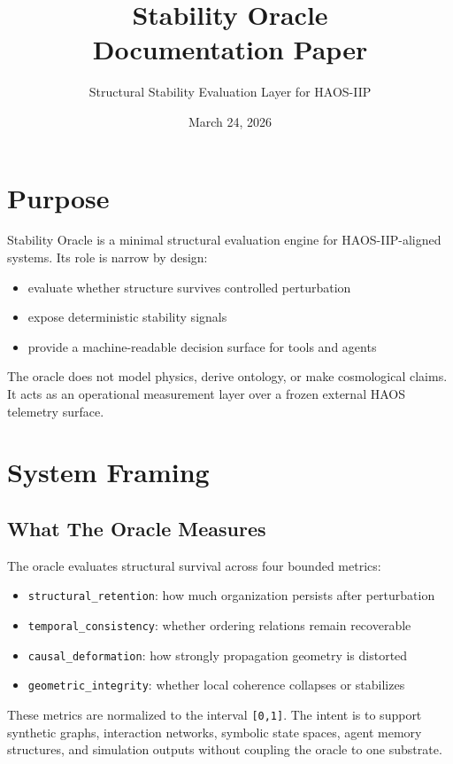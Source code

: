 \documentclass[11pt]{article}
\title{Stability Oracle\\Documentation Paper}
\author{Structural Stability Evaluation Layer for HAOS-IIP}
\date{March 24, 2026}
\begin{document}
\maketitle
\tableofcontents
\newpage

\section{Purpose}

Stability Oracle is a minimal structural evaluation engine for HAOS-IIP-aligned systems.
Its role is narrow by design:

\begin{itemize}
\item evaluate whether structure survives controlled perturbation
\item expose deterministic stability signals
\item provide a machine-readable decision surface for tools and agents
\end{itemize}

The oracle does not model physics, derive ontology, or make cosmological claims.
It acts as an operational measurement layer over a frozen external HAOS telemetry surface.

\section{System Framing}

\subsection{What The Oracle Measures}

The oracle evaluates structural survival across four bounded metrics:

\begin{itemize}
\item \texttt{structural\_retention}: how much organization persists after perturbation
\item \texttt{temporal\_consistency}: whether ordering relations remain recoverable
\item \texttt{causal\_deformation}: how strongly propagation geometry is distorted
\item \texttt{geometric\_integrity}: whether local coherence collapses or stabilizes
\end{itemize}

These metrics are normalized to the interval \texttt{[0,1]}.
The intent is to support synthetic graphs, interaction networks, symbolic state spaces, agent memory structures, and simulation outputs without coupling the oracle to one substrate.
\end{document}
